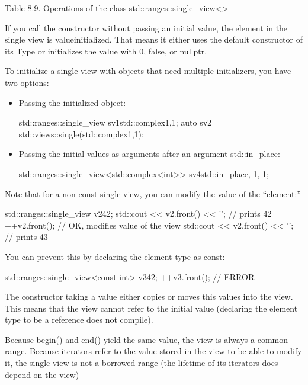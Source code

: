 \begin{center}
Table 8.9. Operations of the class std::ranges::single\_view<>
\end{center}

If you call the constructor without passing an initial value, the element in the single view is valueinitialized. That means it either uses the default constructor of its Type or initializes the value with 0, false, or nullptr.

To initialize a single view with objects that need multiple initializers, you have two options:

\begin{itemize}
\item
Passing the initialized object:

\begin{cpp}
std::ranges::single_view sv1{std::complex{1,1}};
auto sv2 = std::views::single(std::complex{1,1});
\end{cpp}

\item
Passing the initial values as arguments after an argument std::in\_place:

\begin{cpp}
std::ranges::single_view<std::complex<int>> sv4{std::in_place, 1, 1};
\end{cpp}
\end{itemize}

Note that for a non-const single view, you can modify the value of the “element:”

\begin{cpp}
std::ranges::single_view v2{42};
std::cout << v2.front() << '\n'; // prints 42
++v2.front(); // OK, modifies value of the view
std::cout << v2.front() << '\n'; // prints 43
\end{cpp}

You can prevent this by declaring the element type as const:

\begin{cpp}
std::ranges::single_view<const int> v3{42};
++v3.front(); // ERROR
\end{cpp}

The constructor taking a value either copies or moves this values into the view. This means that the view cannot refer to the initial value (declaring the element type to be a reference does not compile).

Because begin() and end() yield the same value, the view is always a common range. Because iterators refer to the value stored in the view to be able to modify it, the single view is not a borrowed range (the lifetime of its iterators does depend on the view)

